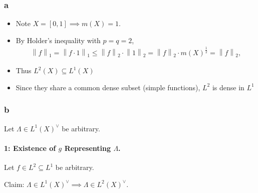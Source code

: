 \begin{solution}
\hypertarget{a-17}{%
\subsubsection{a}\label{a-17}}

\begin{itemize}
\item
  Note \(X = [0, 1] \implies m(X) = 1\).
\item
  By Holder's inequality with \(p=q=2\),
  \begin{align*}
  {\left\lVert {f} \right\rVert}_1 = {\left\lVert {f\cdot 1} \right\rVert}_1 \leq {\left\lVert {f} \right\rVert}_2 \cdot {\left\lVert {1} \right\rVert}_2 = {\left\lVert {f} \right\rVert}_2 \cdot m(X)^{\frac 1 2} = {\left\lVert {f} \right\rVert}_2,
  \end{align*}
\item
  Thus \(L^2(X) \subseteq L^1(X)\)
\item
  Since they share a common dense subset (simple functions), \(L^2\) is
  dense in \(L^1\)
\end{itemize}

\hypertarget{b-16}{%
\subsubsection{b}\label{b-16}}

Let \(\Lambda \in L^1(X)^\vee\) be arbitrary.

\hypertarget{existence-of-g-representing-lambda.}{%
\paragraph{\texorpdfstring{1: Existence of \(g\) Representing
\(\Lambda\).}{1: Existence of g Representing \textbackslash Lambda.}}\label{existence-of-g-representing-lambda.}}

Let \(f\in L^2\subseteq L^1\) be arbitrary.

Claim: \(\Lambda\in L^1(X)^\vee\implies \Lambda \in L^2(X)^\vee\).


\end{solution}
